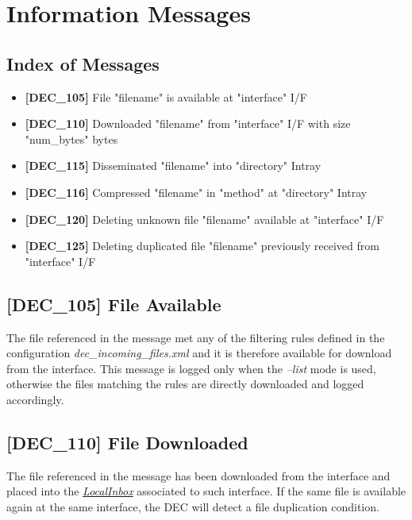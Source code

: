 \documentclass[dec_sum_main.tex]{subfiles}
\begin{document}

\section{Information Messages}

\subsection{Index of Messages}

\begin{itemize}
	\item \textbf{[DEC\_105]} File "filename" is available at "interface" I/F
	\item \textbf{[DEC\_110]} Downloaded "filename" from "interface" I/F with size "num\_bytes" bytes
	\item \textbf{[DEC\_115]} Disseminated "filename" into "directory" Intray
	\item \textbf{[DEC\_116]} Compressed "filename" in "method" at "directory" Intray
	\item \textbf{[DEC\_120]} Deleting unknown file "filename" available at "interface" I/F
	\item \textbf{[DEC\_125]} Deleting duplicated file "filename" previously received from "interface" I/F
\end{itemize}

\subsection{[DEC\_105] File Available}
The file referenced in the message met any of the filtering rules defined in the configuration \textit{dec\_incoming\_files.xml} and it is therefore available for download from the interface. This message is logged only when the \textit{--list} mode is used, otherwise the files matching the rules are directly downloaded and logged accordingly. 

\subsection{[DEC\_110] File Downloaded}
The file referenced in the message has been downloaded from the interface and placed into the \hyperref[LocalInbox]{\textit{LocalInbox}} associated to such interface. If the same file is available again at the same interface, the DEC will detect a file duplication condition.
\end{document}

